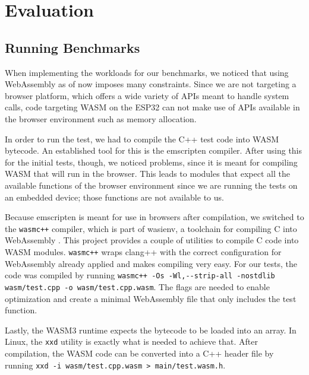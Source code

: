 
\chapter{Evaluation}\label{chapter:evaluation}

\section{Running Benchmarks}

When implementing the workloads for our benchmarks, we noticed that using WebAssembly as of now imposes many constraints. Since we are not targeting a browser platform, which offers a wide variety of APIs meant to handle system calls, code targeting WASM on the ESP32 can not make use of APIs available in the browser environment such as memory allocation. 

In order to run the test, we had to compile the C++ test code into WASM bytecode. An established tool for this is the emscripten compiler. After using this for the initial tests, though, we noticed problems, since it is meant for compiling WASM that will run in the browser. This leads to modules that expect all the available functions of the browser environment since we are running the tests on an embedded device; those functions are not available to us.

\begin{sloppypar}
Because emscripten is meant for use in browsers after compilation, we switched to the \lstinline{wasmc++} compiler, which is part of wasienv, a toolchain for compiling C into WebAssembly \autocite{noauthor_wasienvwasienv_2020}. This project provides a couple of utilities to compile C code into WASM modules. \lstinline{wasmc++} wraps clang++ with the correct configuration for WebAssembly already applied and makes compiling very easy. For our tests, the code was compiled by running \lstinline{wasmc++ -Os -Wl,--strip-all -nostdlib wasm/test.cpp -o wasm/test.cpp.wasm}. The flags are needed to enable optimization and create a minimal WebAssembly file that only includes the test function.
\end{sloppypar}

\begin{sloppypar}
Lastly, the WASM3 runtime expects the bytecode to be loaded into an array. In Linux, the \lstinline{xxd} utility is exactly what is needed to achieve that. After compilation, the WASM code can be converted into a C++ header file by running \lstinline{xxd -i wasm/test.cpp.wasm > main/test.wasm.h}.
\end{sloppypar}

